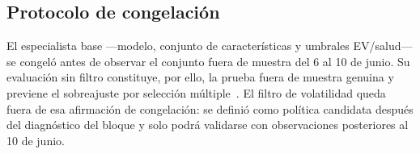 \subsection{Protocolo de congelación}
\label{sec:congelacion}

El especialista base —modelo, conjunto de características y umbrales EV/salud— se congeló
antes de observar el conjunto fuera de muestra del 6 al 10 de junio. Su evaluación sin filtro
constituye, por ello, la prueba fuera de muestra genuina y previene el sobreajuste por
selección múltiple~\cite{bailey2014deflated}. El filtro de volatilidad queda fuera de esa
afirmación de congelación: se definió como política candidata después del diagnóstico del
bloque y solo podrá validarse con observaciones posteriores al 10 de junio.
